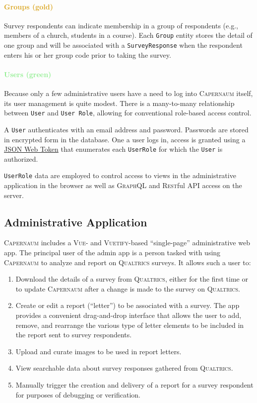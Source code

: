 \documentclass{article}
\newcommand{\caper}{\textsc{Capernaum}}
\newcommand{\gql}{\textsc{GraphQL}}
\newcommand{\rest}{\textsc{Rest}ful}
\newcommand{\vuetify}{\textsc{Vuetify}}
\newcommand{\vue}{\textsc{Vue}}
\newcommand{\qual}{\textsc{Qualtrics}}
\begin{document}
\paragraph{\textcolor{Goldenrod}{Groups (gold)}}

Survey respondents can indicate membership in a group of respondents
(e.g., members of a church, students in a course).
Each \texttt{Group} entity stores the detail of one group
and will be associated with a \texttt{SurveyResponse}
when the respondent enters his or her group code
prior to taking the survey.

\paragraph{\textcolor{LightGreen}{Users (green)}}

Because only a few administrative users have a need to log into \caper{} itself,
its user management is quite modest.
There is a many-to-many relationship between \texttt{User} and \texttt{User Role},
allowing for conventional role-based access control.

A \texttt{User} authenticates with an email address and password.
Passwords are stored in encrypted form in the database.
One a user logs in,
access is granted using a
\href{https://jwt.io/}{JSON Web Token}
that enumerates each \texttt{UserRole} for which the \texttt{User} is authorized.

\texttt{UserRole} data are employed to control access to views
in the administrative application in the browser
as well as \gql{} and \rest{} API access on the server.

\subsection{Administrative Application}
\label{sec:admin-applications}

\caper{} includes a \vue{}- and \vuetify{}-based
``single-page''
administrative web app.
The principal user of the admin app
is a person tasked with using \caper{}
to analyze and report on \qual{} surveys.
It allows such a user to:
\begin{enumerate}
\item Download the details of a survey from \qual{},
  either for the first time or to update \caper{} after a change is made to the survey on \qual.
\item Create or edit a report (``letter'') to be associated with a survey.
  The app provides a convenient drag-and-drop interface
  that allows the user to add, remove, and rearrange the various type of
  letter elements to be included in the report sent to survey respondents.
\item Upload and curate images to be used in report letters.
\item View searchable data about survey responses gathered from \qual.
\item Manually trigger the creation and delivery of a report for a survey respondent
  for purposes of debugging or verification.
  
\end{enumerate}
\end{document}

